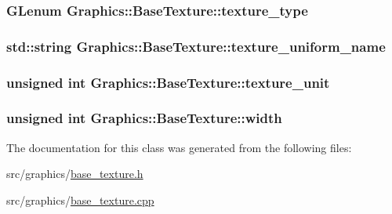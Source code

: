 \subsubsection[{texture\+\_\+type}]{\setlength{\rightskip}{0pt plus 5cm}G\+Lenum Graphics\+::\+Base\+Texture\+::texture\+\_\+type\hspace{0.3cm}{\ttfamily [private]}}\label{class_graphics_1_1_base_texture_a8541c8b38644380478955b823792b4d6}
\hypertarget{class_graphics_1_1_base_texture_a00bca25b10d3fe76e3f415606d302074}{}
\subsubsection[{texture\+\_\+uniform\+\_\+name}]{\setlength{\rightskip}{0pt plus 5cm}std\+::string Graphics\+::\+Base\+Texture\+::texture\+\_\+uniform\+\_\+name\hspace{0.3cm}{\ttfamily [private]}}\label{class_graphics_1_1_base_texture_a00bca25b10d3fe76e3f415606d302074}
\hypertarget{class_graphics_1_1_base_texture_a30d08898d1d01c9960061dc2c8a98091}{}
\subsubsection[{texture\+\_\+unit}]{\setlength{\rightskip}{0pt plus 5cm}unsigned int Graphics\+::\+Base\+Texture\+::texture\+\_\+unit\hspace{0.3cm}{\ttfamily [private]}}\label{class_graphics_1_1_base_texture_a30d08898d1d01c9960061dc2c8a98091}
\hypertarget{class_graphics_1_1_base_texture_ad2790b49e5eab93516a8097c8f9dd422}{}
\subsubsection[{width}]{\setlength{\rightskip}{0pt plus 5cm}unsigned int Graphics\+::\+Base\+Texture\+::width\hspace{0.3cm}{\ttfamily [private]}}\label{class_graphics_1_1_base_texture_ad2790b49e5eab93516a8097c8f9dd422}


The documentation for this class was generated from the following files\+:\begin{DoxyCompactItemize}
\item 
src/graphics/\hyperlink{base__texture_8h}{base\+\_\+texture.\+h}\item 
src/graphics/\hyperlink{base__texture_8cpp}{base\+\_\+texture.\+cpp}\end{DoxyCompactItemize}
